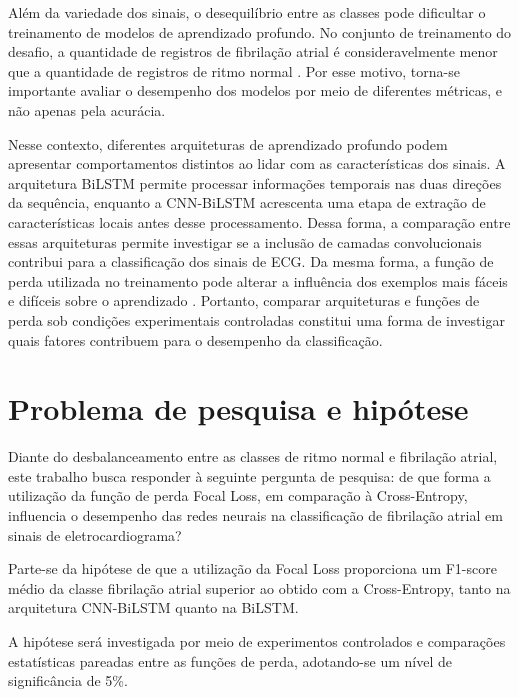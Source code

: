 \documentclass[
    12pt,                %
    openright,           %
    oneside,             %
    a4paper,             %
    english,             %
    brazil               %
]{abntex2}
\begin{document}
Além da variedade dos sinais, o desequilíbrio entre as classes pode dificultar o 
treinamento de modelos de aprendizado profundo. No conjunto de treinamento do desafio, 
a quantidade de registros de fibrilação atrial é consideravelmente menor que a quantidade 
de registros de ritmo normal \cite{Clifford2017}. Por esse motivo, torna-se importante 
avaliar o desempenho dos modelos por meio de diferentes métricas, e não apenas pela acurácia.

Nesse contexto, diferentes arquiteturas de aprendizado profundo podem apresentar comportamentos distintos ao 
lidar com as características dos sinais. A arquitetura BiLSTM permite processar informações temporais nas duas 
direções da sequência, enquanto a CNN-BiLSTM acrescenta uma etapa de extração de características locais antes desse 
processamento. Dessa forma, a comparação entre essas arquiteturas permite investigar se a inclusão de camadas convolucionais 
contribui para a classificação dos sinais de ECG. Da mesma forma, a função de perda utilizada no treinamento pode alterar a 
influência dos exemplos mais fáceis e difíceis sobre o aprendizado \cite{Lin2017}. Portanto, comparar arquiteturas e funções de 
perda sob condições experimentais controladas constitui uma forma de investigar quais fatores contribuem para o desempenho da classificação.


\section{Problema de pesquisa e hipótese}
\label{sec:problema_hipotese}

Diante do desbalanceamento entre as classes de ritmo
normal e fibrilação atrial, este trabalho busca responder
à seguinte pergunta de pesquisa: de que forma a
utilização da função de perda Focal Loss, em comparação
à Cross-Entropy, influencia o desempenho das redes
neurais na classificação de fibrilação atrial em
sinais de eletrocardiograma?

Parte-se da hipótese de que a utilização da Focal Loss
proporciona um F1-score médio da classe fibrilação
atrial superior ao obtido com a Cross-Entropy, tanto
na arquitetura CNN-BiLSTM quanto na BiLSTM.

A hipótese será investigada por meio de experimentos
controlados e comparações estatísticas pareadas entre
as funções de perda, adotando-se um nível de
significância de 5\%.



\end{document}
